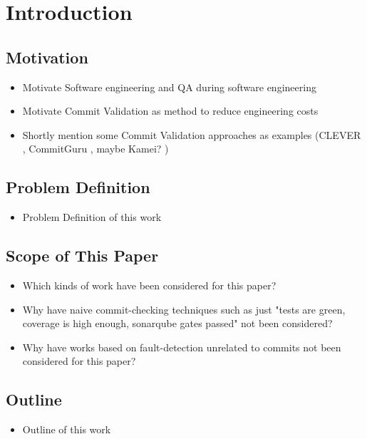 \section{Introduction}

\subsection{Motivation}
\begin{itemize}
	\item Motivate Software engineering and QA during software engineering
	\item Motivate Commit Validation as method to reduce engineering costs
	\item Shortly mention some Commit Validation approaches as examples (CLEVER \cite{Nayrolles2018}, CommitGuru \cite{Rosen2015}, maybe Kamei? \cite{Kamei2013})
\end{itemize}

\subsection{Problem Definition}
\begin{itemize}
	\item Problem Definition of this work
\end{itemize}

\subsection{Scope of This Paper}
\label{sec:scope}
\begin{itemize}
	\item Which kinds of work have been considered for this paper?
	\item Why have naive commit-checking techniques such as just "tests are green, coverage is high enough, sonarqube gates passed" not been considered?
	\item Why have works based on fault-detection unrelated to commits not been considered for this paper?
\end{itemize}

\subsection{Outline}
\begin{itemize}
	\item Outline of this work
\end{itemize}


